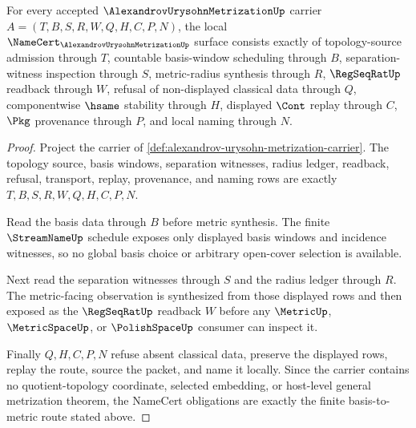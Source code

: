 \begin{theorem}
\label{thm:alexandrov-urysohn-metrization-namecert-obligations}
For every accepted $\AlexandrovUrysohnMetrizationUp$ carrier $A=(T,B,S,R,W,Q,H,C,P,N)$, the local $\NameCert_{\AlexandrovUrysohnMetrizationUp}$ surface consists exactly of topology-source admission through $T$, countable basis-window scheduling through $B$, separation-witness inspection through $S$, metric-radius synthesis through $R$, $\RegSeqRatUp$ readback through $W$, refusal of non-displayed classical data through $Q$, componentwise $\hsame$ stability through $H$, displayed $\Cont$ replay through $C$, $\Pkg$ provenance through $P$, and local naming through $N$.
\end{theorem}
\begin{proof}
Project the carrier of \autoref{def:alexandrov-urysohn-metrization-carrier}. The topology source, basis windows, separation witnesses, radius ledger, readback, refusal, transport, replay, provenance, and naming rows are exactly $T,B,S,R,W,Q,H,C,P,N$.

Read the basis data through $B$ before metric synthesis. The finite $\StreamNameUp$ schedule exposes only displayed basis windows and incidence witnesses, so no global basis choice or arbitrary open-cover selection is available.

Next read the separation witnesses through $S$ and the radius ledger through $R$. The metric-facing observation is synthesized from those displayed rows and then exposed as the $\RegSeqRatUp$ readback $W$ before any $\MetricUp$, $\MetricSpaceUp$, or $\PolishSpaceUp$ consumer can inspect it.

Finally $Q,H,C,P,N$ refuse absent classical data, preserve the displayed rows, replay the route, source the packet, and name it locally. Since the carrier contains no quotient-topology coordinate, selected embedding, or host-level general metrization theorem, the NameCert obligations are exactly the finite basis-to-metric route stated above.
\end{proof}

